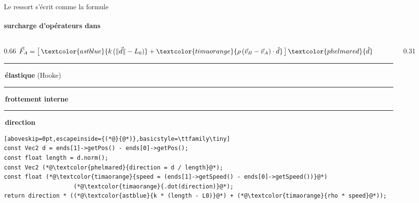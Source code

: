 \begin{frame}[fragile]{Le ressort s'écrit comme la formule}
  \framesubtitle{surcharge d'opérateurs dans }
  \begin{columns}[c,onlytextwidth]
    \begin{column}{0.66\textwidth}
      \centering
      {\large
      $\vec F_A = \big[\,\textcolor{astblue}{k\,(\lVert\vec d\rVert - L_0)}
        + \textcolor{timaorange}{\rho\,(\vec v_B-\vec v_A)\cdot\hat d}\,\big]\,
        \textcolor{phelmared}{\hat d}$}
      \par\vspace{1.5mm}
      {\scriptsize
        \textcolor{astblue}{\rule{2mm}{2mm}}\,\textbf{élastique} (Hooke)\enspace
        \textcolor{timaorange}{\rule{2mm}{2mm}}\,\textbf{frottement interne}\enspace
        \textcolor{phelmared}{\rule{2mm}{2mm}}\,\textbf{direction}}
      \par\vspace{2mm}
      \raggedright\hspace*{2mm}\par\nointerlineskip
\begin{lstlisting}[aboveskip=0pt,escapeinside={(*@}{@*)},basicstyle=\ttfamily\tiny]
const Vec2 d = ends[1]->getPos() - ends[0]->getPos();
const float length = d.norm();
const Vec2 (*@\textcolor{phelmared}{direction = d / length}@*);
const float (*@\textcolor{timaorange}{speed = (ends[1]->getSpeed() - ends[0]->getSpeed())}@*)
                    (*@\textcolor{timaorange}{.dot(direction)}@*);
return direction * ((*@\textcolor{astblue}{k * (length - L0)}@*) + (*@\textcolor{timaorange}{rho * speed}@*));
\end{lstlisting}
    \end{column}
    \begin{column}{0.31\textwidth}
    \end{column}
  \end{columns}
\end{frame}


